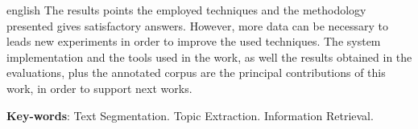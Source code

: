 \begin{resumo}[Abstract]
\begin{otherlanguage*}{english}
The results points the employed techniques and the methodology presented gives satisfactory answers. However, more data can be necessary to leads new experiments in order to improve the used techniques.  
The system implementation and the tools used in the work, as well the results obtained in the evaluations, plus the annotated corpus are the principal contributions of this work, in order to support next works.










\textbf{Key-words}: 
Text Segmentation.
Topic Extraction.
Information Retrieval.

 \end{otherlanguage*}
\end{resumo}

